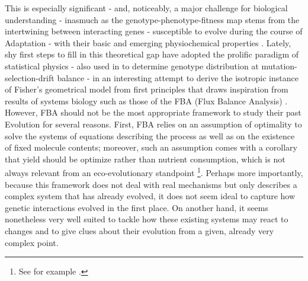 This is especially significant - and, noticeably, a major challenge for biological understanding \citep{Young19} - inasmuch as the genotype-phenotype-fitness map stems from the intertwining between interacting genes - susceptible to evolve \citep{Gros09} during the course of Adaptation - with their basic and emerging physiochemical properties \citep{Bershtein17,Bergelson21}. %
Lately, shy first steps to fill in this theoretical gap have adopted the prolific paradigm of statistical physics - also used in \citep{Sella05} to determine genotype distribution at mutation-selection-drift balance - in an interesting attempt to derive the isotropic instance of Fisher's geometrical model from first principles \citep{Martin14} that draws inspiration from results of systems biology such as those of the FBA (Flux Balance Analysis) \citep{Orth10}. However, FBA should not be the most appropriate framework to study their past Evolution for several reasons. First, FBA relies on an assumption of optimality to solve the systems of equations describing the process as well as on the existence of fixed molecule contents; moreover, such an assumption comes with a corollary that yield should be optimize rather than nutrient consumption, which is not always relevant from an eco-evolutionary standpoint \footnote{See for example \citet{Schuster08} .}. Perhaps more importantly, because this framework does not deal with real mechanisms but only describes a complex system that has already evolved, it does not seem ideal to capture how genetic interactions evolved in the first place. On another hand, it seems nonetheless very well suited to tackle how these existing systems may react to changes and to give clues about their evolution from a given, already very complex point.

